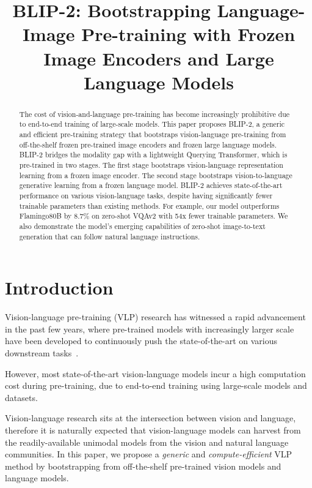 \title{BLIP-2: Bootstrapping Language-Image Pre-training with Frozen Image Encoders and Large Language Models}

\begin{abstract}
The cost of vision-and-language pre-training has become increasingly prohibitive due to end-to-end training of large-scale models. This paper proposes BLIP-2, a generic and efficient pre-training strategy that bootstraps vision-language pre-training from off-the-shelf frozen pre-trained image encoders and frozen large language models. BLIP-2 bridges the modality gap with a lightweight Querying Transformer, which is pre-trained in two stages. The first stage bootstraps vision-language representation learning from a frozen image encoder. The second stage bootstraps vision-to-language generative learning from a frozen language model. BLIP-2 achieves state-of-the-art performance on various vision-language tasks, despite having significantly fewer trainable parameters than existing methods. For example, our model outperforms Flamingo80B by 8.7\% on zero-shot VQAv2 with 54x fewer trainable parameters. We also demonstrate the model's emerging capabilities of zero-shot image-to-text generation that can follow natural language instructions.
\end{abstract}

\section{Introduction}

\label{sec:intro}

Vision-language pre-training (VLP) research has witnessed a rapid advancement in the past few years, where pre-trained models with increasingly larger scale have been developed to continuously push the state-of-the-art on various downstream tasks~\cite{clip,ALBEF,blip,ofa,flamingo,beit3}.

However, most state-of-the-art vision-language models incur a high computation cost during pre-training, due to end-to-end training using large-scale models and datasets.

Vision-language research sits at the intersection between vision and language, therefore it is naturally expected that vision-language models can harvest from the readily-available unimodal models from the vision and natural language communities. In this paper, we propose a \textit{generic} and \textit{compute-efficient} VLP method by bootstrapping from off-the-shelf pre-trained vision models and language models.

